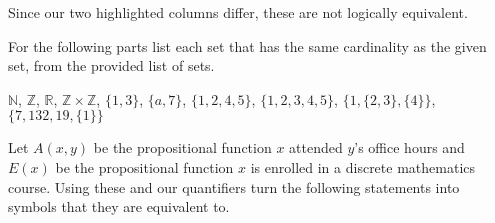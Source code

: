 \documentclass[addpoints,12pt]{exam}
\newcommand{\naturals}{\mathbb{N}}
\newcommand{\integers}{\mathbb{Z}}
\newcommand{\reals}{\mathbb{R}}
\begin{document}
\begin{questions}
\begin{parts}
\begin{solution}
      Since our two highlighted columns differ, these are not logically
      equivalent.
    \end{solution}
  \end{parts}

  \question[20] For the following parts list each set that has the same
  cardinality as the given set, from the provided list of sets.
  \begin{center}
    $\naturals$, $\integers$, $\reals$, $\integers\times \integers$, $\{1,3\}$,
    $\{a, 7\}$, $\{1,2,4,5\}$, $\{1,2,3,4,5\}$, $\{1,\{2,3\},\{4\}\}$,
    $\{7,132,19,\{1\}\}$
  \end{center}

  \question[10] Let $A(x,y)$ be the propositional function $x$ attended $y$'s
  office hours and $E(x)$ be the propositional function $x$ is enrolled in a
  discrete mathematics course. Using these and our quantifiers turn the
  following statements into symbols that they are equivalent to.
  \begin{parts}

\end{parts}
\end{questions}
\end{document}

